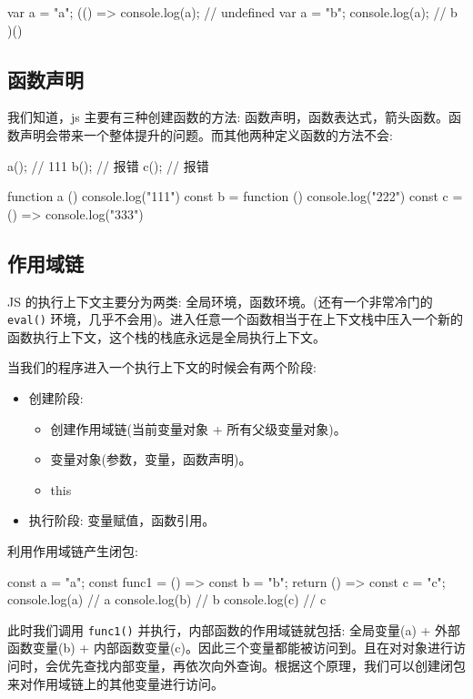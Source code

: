 \begin{JavaScript}
var a = "a";
(() => {
  console.log(a);   // undefined
  var a = "b";
  console.log(a);   // b
})()
\end{JavaScript}

\subsection{函数声明}

我们知道，js 主要有三种创建函数的方法: 函数声明，函数表达式，箭头函数。函数声明会带来一个整体提升的问题。而其他两种定义函数的方法不会:

\begin{JavaScript}
a();  // 111
b();  // 报错
c();  // 报错

function a () {
  console.log("111")
}
const b = function () {
  console.log("222")
}
const c = () => {
  console.log("333")
}
\end{JavaScript}

\subsection{作用域链}

JS 的执行上下文主要分为两类: 全局环境，函数环境。(还有一个非常冷门的 \texttt{eval()} 环境，几乎不会用)。进入任意一个函数相当于在上下文栈中压入一个新的函数执行上下文，这个栈的栈底永远是全局执行上下文。

当我们的程序进入一个执行上下文的时候会有两个阶段:
\begin{itemize}
  \item 创建阶段:
  \begin{itemize}
    \item 创建作用域链(当前变量对象 + 所有父级变量对象)。
    \item 变量对象(参数，变量，函数声明)。
    \item this
  \end{itemize}
  \item 执行阶段: 变量赋值，函数引用。
\end{itemize}

利用作用域链产生闭包:

\begin{JavaScript}
const a = "a";
const func1 = () => {
  const b = "b";
  return () => {
    const c = "c";
    console.log(a)  // a
    console.log(b)  // b
    console.log(c)  // c
  }
}
\end{JavaScript}

此时我们调用 \texttt{func1()} 并执行，内部函数的作用域链就包括: 全局变量(a) + 外部函数变量(b) + 内部函数变量(c)。因此三个变量都能被访问到。且在对对象进行访问时，会优先查找内部变量，再依次向外查询。根据这个原理，我们可以创建闭包来对作用域链上的其他变量进行访问。